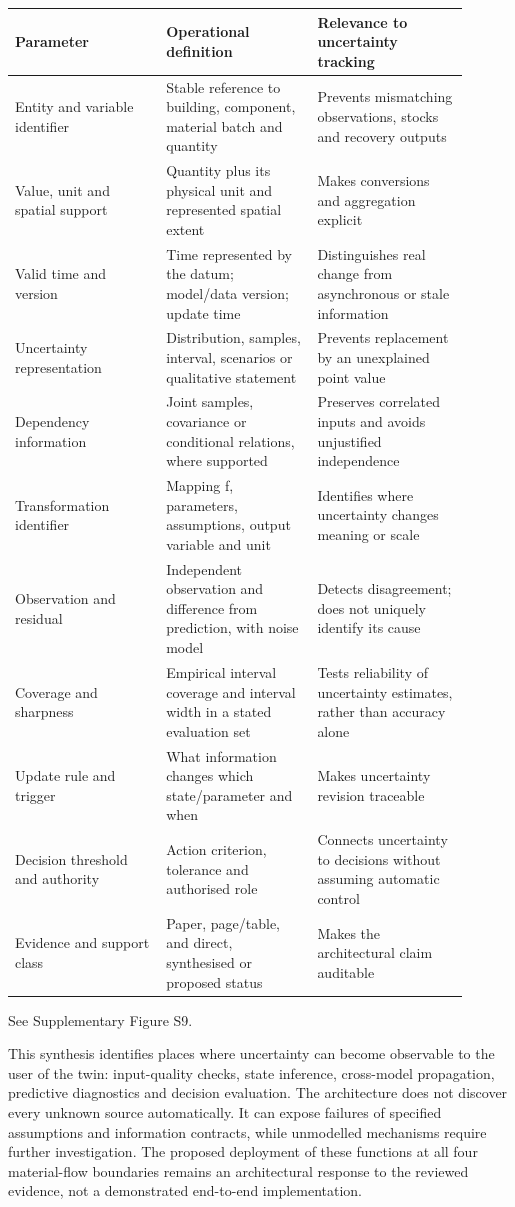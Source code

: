 \begin{longtable}{p{0.3\linewidth}p{0.3\linewidth}p{0.3\linewidth}}
\toprule
Parameter & Operational definition & Relevance to uncertainty tracking\\
\midrule
Entity and variable identifier & Stable reference to building, component, material batch and quantity & Prevents mismatching observations, stocks and recovery outputs\\
Value, unit and spatial support & Quantity plus its physical unit and represented spatial extent & Makes conversions and aggregation explicit\\
Valid time and version & Time represented by the datum; model/data version; update time & Distinguishes real change from asynchronous or stale information\\
Uncertainty representation & Distribution, samples, interval, scenarios or qualitative statement & Prevents replacement by an unexplained point value\\
Dependency information & Joint samples, covariance or conditional relations, where supported & Preserves correlated inputs and avoids unjustified independence\\
Transformation identifier & Mapping f, parameters, assumptions, output variable and unit & Identifies where uncertainty changes meaning or scale\\
Observation and residual & Independent observation and difference from prediction, with noise model & Detects disagreement; does not uniquely identify its cause\\
Coverage and sharpness & Empirical interval coverage and interval width in a stated evaluation set & Tests reliability of uncertainty estimates, rather than accuracy alone\\
Update rule and trigger & What information changes which state/parameter and when & Makes uncertainty revision traceable\\
Decision threshold and authority & Action criterion, tolerance and authorised role & Connects uncertainty to decisions without assuming automatic control\\
Evidence and support class & Paper, page/table, and direct, synthesised or proposed status & Makes the architectural claim auditable\\
\bottomrule
\end{longtable}
See Supplementary Figure S9.

This synthesis identifies places where uncertainty can become observable to the user of the twin: input-quality checks, state inference, cross-model propagation, predictive diagnostics and decision evaluation. The architecture does not discover every unknown source automatically. It can expose failures of specified assumptions and information contracts, while unmodelled mechanisms require further investigation. The proposed deployment of these functions at all four material-flow boundaries remains an architectural response to the reviewed evidence, not a demonstrated end-to-end implementation.


